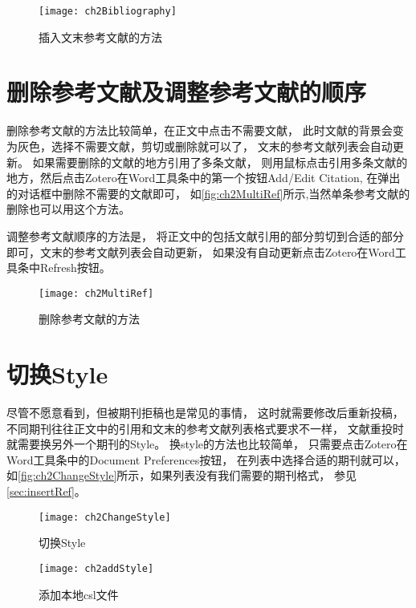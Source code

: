 \documentclass[cn,11pt,chinese]{elegantbook}
\begin{document}
\begin{enumerate}
			\begin{figure}[htbp]
				\centering
				\texttt{[image: ch2Bibliography]}
				\caption{插入文末参考文献的方法}
				\label{fig:ch2Bibliography}
			\end{figure}
		\end{enumerate}
		\section{删除参考文献及调整参考文献的顺序}
		删除参考文献的方法比较简单，在正文中点击不需要文献，
		此时文献的背景会变为灰色，选择不需要文献，剪切或删除就可以了，
		文末的参考文献列表会自动更新。
		如果需要删除的文献的地方引用了多条文献，
		则用鼠标点击引用多条文献的地方，然后点击Zotero在Word工具条中的第一个按钮Add/Edit Citation,
		在弹出的对话框中删除不需要的文献即可，
		如\autoref{fig:ch2MultiRef}所示,当然单条参考文献的删除也可以用这个方法。
		
		调整参考文献顺序的方法是，
		将正文中的包括文献引用的部分剪切到合适的部分即可，文末的参考文献列表会自动更新，
		如果没有自动更新点击Zotero在Word工具条中Refresh按钮。
		
		\begin{figure}[htbp]
			\centering
			\texttt{[image: ch2MultiRef]}
			\caption{删除参考文献的方法}
			\label{fig:ch2MultiRef}
		\end{figure}
		\section{切换Style}\label{sec:changeStyle}
			尽管不愿意看到，但被期刊拒稿也是常见的事情，
			这时就需要修改后重新投稿，不同期刊往往正文中的引用和文末的参考文献列表格式要求不一样，
			文献重投时就需要换另外一个期刊的Style。
			换style的方法也比较简单，
			只需要点击Zotero在Word工具条中的Document Preferences按钮，
			在列表中选择合适的期刊就可以，
			如\autoref{fig:ch2ChangeStyle}所示，如果列表没有我们需要的期刊格式，
			参见\cref{sec:insertRef}。
				\begin{figure}
					\centering
					\texttt{[image: ch2ChangeStyle]}
					\caption{切换Style}
					\label{fig:ch2ChangeStyle}
				\end{figure}
				\begin{figure}[htbp]
					\centering
					\texttt{[image: ch2addStyle]}
					\caption{添加本地csl文件}
					\label{fig:ch2addStyle}
				\end{figure}
\end{document}
